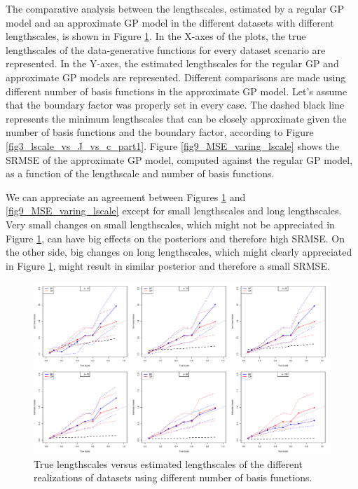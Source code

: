 \documentclass[]{interact}
\theoremstyle{plain}%
\theoremstyle{definition}
\theoremstyle{remark}
\begin{document}
The comparative analysis between the lengthscales, estimated by a regular GP model and an approximate GP model in the different datasets with different lengthscales, is shown in Figure \ref{fig8_Tlscale_vs_Elscale}. In the X-axes of the plots, the true lengthscales of the data-generative functions for every dataset scenario are represented. In the Y-axes, the estimated lengthscales for the regular GP and approximate GP models are represented. Different comparisons are made using different number of basis functions in the approximate GP model. Let's assume that the boundary factor was properly set in every case. The dashed black line represents the minimum lengthscales that can be closely approximate given the number of basis functions and the boundary factor, according to Figure \ref{fig3_lscale_vs_J_vs_c_part1}. Figure \ref{fig9_MSE_varing_lscale} shows the SRMSE of the approximate GP model, computed against the regular GP model, as a function of the lengthscale and number of basis functions.

We can appreciate an agreement between Figures \ref{fig8_Tlscale_vs_Elscale} and \ref{fig9_MSE_varing_lscale} except for small lengthscales and long lengthscales. Very small changes on small lengthscales, which might not be appreciated in Figure \ref{fig8_Tlscale_vs_Elscale}, can have big effects on the posteriors and therefore high SRMSE. On the other side, big changes on long lengthscales, which might clearly appreciated in Figure \ref{fig8_Tlscale_vs_Elscale}, might result in similar posterior and therefore a small SRMSE.

\begin{figure}
\centering
\includegraphics[width=\textwidth]{fig8_Tlscale_vs_Elscale.pdf}
\caption{True lengthscales versus estimated lengthscales of the different realizations of datasets using different number of basis functions. }
  \label{fig8_Tlscale_vs_Elscale}
\end{figure}
\end{document}
